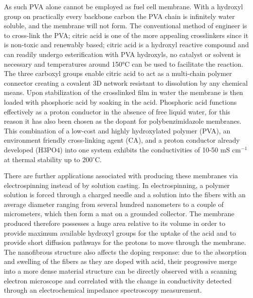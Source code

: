 \documentclass[12pt,a4paper]{report}
\begin{document}
As such PVA alone cannot be employed as fuel cell membrane. With a hydroxyl group on practically every backbone carbon the PVA chain is infinitely water soluble, and the membrane will not form. The conventional method of engineer is to cross-link the PVA; citric acid is one of the more appealing crosslinkers since it is non-toxic and renewably based; citric acid is a hydroxyl reactive compound and can readily undergo esterification with PVA hydroxyls, no catalyst or solvent is necessary and temperatures around 150°C can be used to facilitate the reaction.\cite{50,51} 
The three carboxyl groups enable citric acid to act as a multi-chain polymer connector creating a covalent 3D network resistant to dissolution by any chemical means.\cite{48,53} Upon stabilization of the crosslinked film in water the membrane is then loaded with phosphoric acid by soaking in the acid. Phosphoric acid functions effectively as a proton conductor in the absence of free liquid water, for this reason it has also been chosen as the dopant for polybenzimidazole membranes.\cite{21,55} 
This combination of a low-cost and highly hydroxylated polymer (PVA), an environment friendly cross-linking agent (CA), and a proton conductor already developed (H\(3\)PO\(4\)) into one system exhibits the conductivities of 10-50 mS cm\(^{-1}\) at thermal stability up to 200\(^\circ\)C.\cite{9,12,13}

There are further applications associated with producing these membranes via electrospinning instead of by solution casting. In electrospinning, a polymer solution is forced through a charged needle and a solution into the fibers with an average diameter ranging from several hundred nanometers to a couple of micrometers, which then form a mat on a grounded collector\cite{37,38}.
The membrane produced therefore possesses a huge area relative to its volume in order to provide maximum available hydroxyl groups for the uptake of the acid and to provide short diffusion pathways for the protons to move through the membrane.\cite{40,41,42}
 The nanofibrous structure also affects the doping response: due to the absorption and swelling of the fibers as they are doped with acid, their progressive merge into a more dense material structure can be directly observed with a scanning electron microscope and correlated with the change in conductivity detected through an electrochemical impedance spectroscopy measurement.\cite{39,52}
\end{document}
